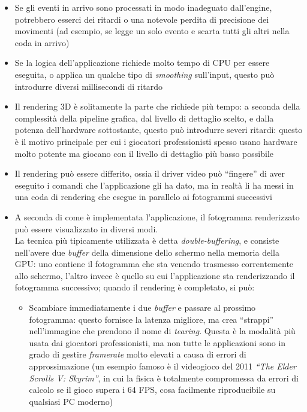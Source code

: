 \begin{itemize}
	\item Se gli eventi in arrivo sono processati in modo inadeguato dall'engine, potrebbero esserci dei ritardi o una notevole perdita di precisione dei movimenti (ad esempio, se legge un solo evento e scarta tutti gli altri nella coda in arrivo)
	\item Se la logica dell'applicazione richiede molto tempo di CPU per essere eseguita, o applica un qualche tipo di \textit{smoothing} sull'input, questo può introdurre diversi millisecondi di ritardo
	\item Il rendering 3D è solitamente la parte che richiede più tempo: a seconda della complessità della pipeline grafica, dal livello di dettaglio scelto, e dalla potenza dell'hardware sottostante, questo può introdurre severi ritardi: questo è il motivo principale per cui i giocatori professionisti spesso usano hardware molto potente ma giocano con il livello di dettaglio più basso possibile
	\item Il rendering può essere differito, ossia il driver video può ``fingere'' di aver eseguito i comandi che l'applicazione gli ha dato, ma in realtà li ha messi in una coda di rendering che esegue in parallelo ai fotogrammi successivi
	\item A seconda di come è implementata l'applicazione, il fotogramma renderizzato può essere visualizzato in diversi modi.\\
	La tecnica più tipicamente utilizzata è detta \textit{double-buffering}, e consiste nell'avere due \textit{buffer} della dimensione dello schermo nella memoria della GPU: uno contiene il fotogramma che sta venendo trasmesso correntemente allo schermo, l'altro invece è quello su cui l'applicazione sta renderizzando il fotogramma successivo; quando il rendering è completato, si può:
	\begin{itemize}
		\item Scambiare immediatamente i due \textit{buffer} e passare al prossimo fotogramma: questo fornisce la latenza migliore, ma crea ``strappi'' nell'immagine che prendono il nome di \textit{tearing}. Questa è la modalità più usata dai giocatori professionisti, ma non tutte le applicazioni sono in grado di gestire \textit{framerate} molto elevati a causa di errori di approssimazione (un esempio famoso è il videogioco del 2011 \textit{``The Elder Scrolls V: Skyrim''}, in cui la fisica è totalmente compromessa da errori di calcolo se il gioco supera i 64 FPS, cosa facilmente riproducibile su qualsiasi PC moderno)

\end{itemize}
\end{itemize}
